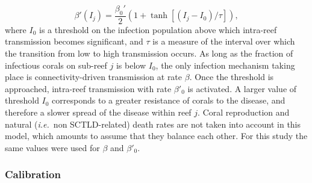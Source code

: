 \documentclass[utf8]{frontiersSCNS}
\newcommand{\ie}{{\it i.e.}\ }
\begin{document}
\begin{equation}
    \beta'(I_j) = \dfrac{\beta_0'}{2}(1+\tanh[(I_j-I_0)/\tau]),\label{eq:beta}
\end{equation}
where $I_0$ is a threshold on the infection population above which intra-reef transmission becomes significant, and $\tau$ is a measure of the interval over which the transition from low to high transmission occurs. As long as the fraction of infectious corals on sub-reef $j$ is below $I_0$, the only infection mechanism taking place is connectivity-driven transmission at rate $\beta$. Once the threshold is approached, intra-reef transmission with rate $\beta'_0$ is activated. A larger value of threshold $I_0$ corresponds to a greater resistance of corals to the disease, and therefore a slower spread of the disease within reef $j$. Coral reproduction and natural (\ie non SCTLD-related) death rates are not taken into account in this model, which amounts to assume that they balance each other. For this study the same values were used for $\beta$ and $\beta'_0$.

\subsubsection{Calibration}
\end{document}
